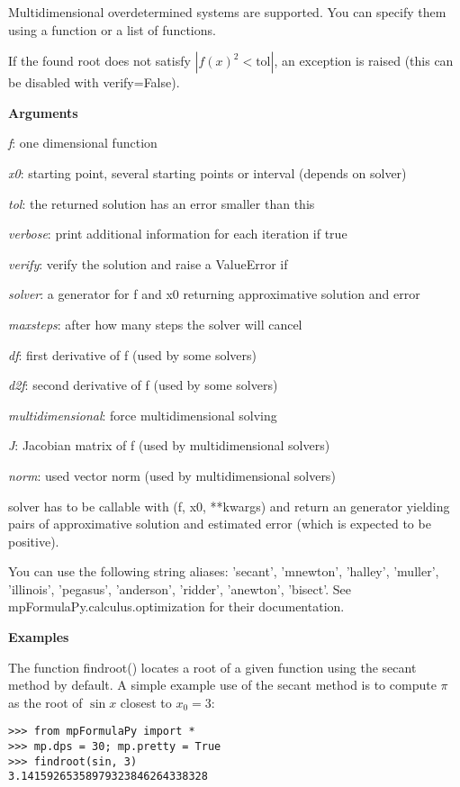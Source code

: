 \vpara
Multidimensional overdetermined systems are supported. You can specify them using a function or a list of functions.

If the found root does not satisfy $|f(x)^2< \text{tol}|$, an exception is raised (this can be disabled with verify=False).

\vpara
\textbf{Arguments}

\vpara
\textit{f}: one dimensional function

\vpara
\textit{x0}: starting point, several starting points or interval (depends on solver)

\vpara
\textit{tol}: the returned solution has an error smaller than this

\vpara
\textit{verbose}: print additional information for each iteration if true

\vpara
\textit{verify}: verify the solution and raise a ValueError if

\vpara
\textit{solver}: a generator for f and x0 returning approximative solution and error

\vpara
\textit{maxsteps}: after how many steps the solver will cancel

\vpara
\textit{df}: first derivative of f (used by some solvers)

\vpara
\textit{d2f}: second derivative of f (used by some solvers)

\vpara
\textit{multidimensional}: force multidimensional solving

\vpara
\textit{J}: Jacobian matrix of f (used by multidimensional solvers)

\vpara
\textit{norm}: used vector norm (used by multidimensional solvers)

\vpara
solver has to be callable with (f, x0, **kwargs) and return an generator yielding pairs of approximative solution and estimated error (which is expected to be positive).

\vpara
You can use the following string aliases: 'secant', 'mnewton', 'halley', 'muller', 'illinois', 'pegasus', 'anderson', 'ridder', 'anewton', 'bisect'. See mpFormulaPy.calculus.optimization for their documentation.

\vpara
\textbf{Examples}

\vpara
The function findroot() locates a root of a given function using the secant method by default. A simple example use of the secant method is to compute $\pi$ as the root of $\sin x$ closest to $x_0=3$:


\begin{lstlisting}
>>> from mpFormulaPy import *
>>> mp.dps = 30; mp.pretty = True
>>> findroot(sin, 3)
3.14159265358979323846264338328
\end{lstlisting}

